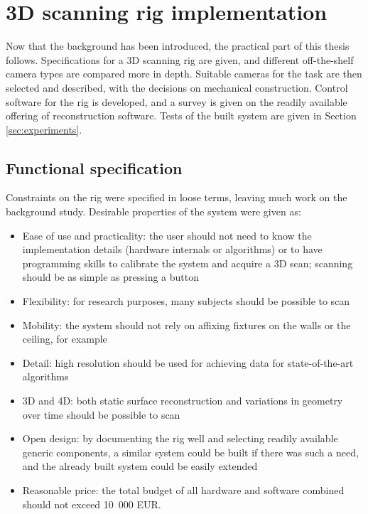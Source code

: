 \section{3D scanning rig implementation} \label{sec:implementation}

Now that the background has been introduced, the practical part of this thesis follows.
Specifications for a 3D scanning rig are given, and different off-the-shelf camera types are compared more in depth.
Suitable cameras for the task are then selected and described, with the decisions on mechanical construction.
Control software for the rig is developed, and a survey is given on the readily available offering of reconstruction software.
Tests of the built system are given in Section \ref{sec:experiments}.

\subsection{Functional specification} %

Constraints on the rig were specified in loose terms, leaving much work on the background study.
Desirable properties of the system were given as:

\begin{itemize}
	\item Ease of use and practicality: the user should not need to know the implementation details (hardware internals or algorithms) or to have programming skills to calibrate the system and acquire a 3D scan; scanning should be as simple as pressing a button
	\item Flexibility: for research purposes, many subjects should be possible to scan
	\item Mobility: the system should not rely on affixing fixtures on the walls or the ceiling, for example
	\item Detail: high resolution should be used for achieving data for state-of-the-art algorithms
	\item 3D and 4D: both static surface reconstruction and variations in geometry over time should be possible to scan
	\item Open design: by documenting the rig well and selecting readily available generic components, a similar system could be built if there was such a need, and the already built system could be easily extended
	\item Reasonable price: the total budget of all hardware and software combined should not exceed 10~000 EUR.
\end{itemize}

